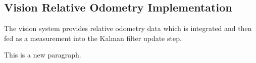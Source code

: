 \documentclass[bare_jrnl_transmag]{subfiles}
\begin{document}
\subsection{Vision Relative Odometry Implementation}
The vision system provides relative odometry data which is integrated and then fed as a measurement into the Kalman filter update step.

This is a new paragraph.
\end{document}
